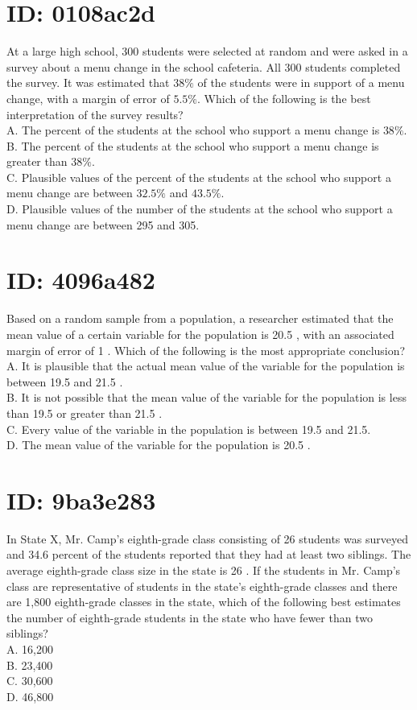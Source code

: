 \section*{ID: 0108ac2d}
At a large high school, 300 students were selected at random and were asked in a survey about a menu change in the school cafeteria. All 300 students completed the survey. It was estimated that $38 \%$ of the students were in support of a menu change, with a margin of error of $5.5 \%$. Which of the following is the best interpretation of the survey results?\\
A. The percent of the students at the school who support a menu change is $38 \%$.\\
B. The percent of the students at the school who support a menu change is greater than $38 \%$.\\
C. Plausible values of the percent of the students at the school who support a menu change are between $32.5 \%$ and $43.5 \%$.\\
D. Plausible values of the number of the students at the school who support a menu change are between 295 and 305.

\section*{ID: 4096a482}
Based on a random sample from a population, a researcher estimated that the mean value of a certain variable for the population is 20.5 , with an associated margin of error of 1 . Which of the following is the most appropriate conclusion?\\
A. It is plausible that the actual mean value of the variable for the population is between 19.5 and 21.5 .\\
B. It is not possible that the mean value of the variable for the population is less than 19.5 or greater than 21.5 .\\
C. Every value of the variable in the population is between 19.5 and 21.5.\\
D. The mean value of the variable for the population is 20.5 .

\section*{ID: 9ba3e283}
In State X, Mr. Camp's eighth-grade class consisting of 26 students was surveyed and 34.6 percent of the students reported that they had at least two siblings. The average eighth-grade class size in the state is 26 . If the students in Mr. Camp's class are representative of students in the state's eighth-grade classes and there are 1,800 eighth-grade classes in the state, which of the following best estimates the number of eighth-grade students in the state who have fewer than two siblings?\\
A. 16,200\\
B. 23,400\\
C. 30,600\\
D. 46,800

